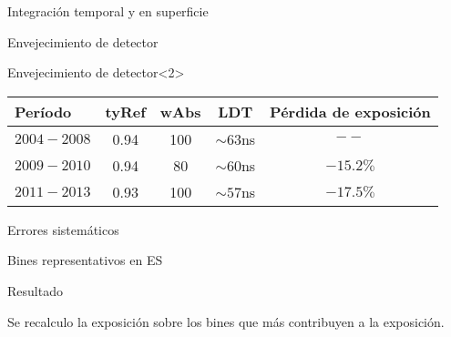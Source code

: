 \begin{frame}{Integraci\'on temporal y en superficie}
	\begin{block}{Envejecimiento de detector}
		\begin{center}
		\end{center}
	\end{block}
	\begin{block}{Envejecimiento de detector}<2>
		\begin{center}
		\renewcommand{\arraystretch}{1.4}
		\footnotesize
		\begin{tabular}{|l|ccc|c|}
					\hline
					Período       & tyRef & wAbs & LDT        &    Pérdida de exposición \\
					\hline
					$2004 - 2008$ & 0.94  & 100  & $\sim63$ns &    $--$ \\
					$2009 - 2010$ & 0.94  & 80   & $\sim60$ns &    $-15.2\%$\\
					$2011 - 2013$ & 0.93  & 100  & $\sim57$ns &    $-17.5\%$\\
					\hline
		\end{tabular}
		\end{center}
	\end{block}
\end{frame}

\begin{frame}{Errores sistem\'aticos}
	\begin{alertblock}{Bines representativos en ES}
		\begin{center}
		\end{center}
	\end{alertblock}
	\begin{block}{Resultado}
		\begin{center}
			Se recalculo la exposici\'on sobre los bines que m\'as contribuyen a la exposici\'on.
		\end{center}
	\end{block}
\end{frame}

